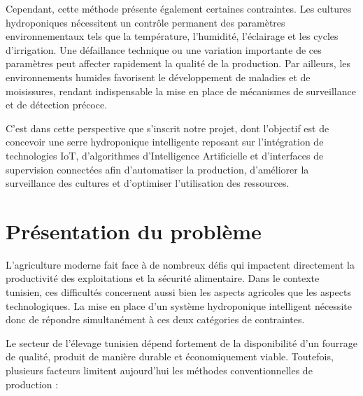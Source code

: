 Cependant, cette méthode présente également certaines contraintes. Les cultures hydroponiques nécessitent un contrôle permanent des paramètres environnementaux tels que la température, l’humidité, l’éclairage et les cycles d’irrigation. Une défaillance technique ou une variation importante de ces paramètres peut affecter rapidement la qualité de la production. Par ailleurs, les environnements humides favorisent le développement de maladies et de moisissures, rendant indispensable la mise en place de mécanismes de surveillance et de détection précoce.

C’est dans cette perspective que s’inscrit notre projet, dont l’objectif est de concevoir une serre hydroponique intelligente reposant sur l’intégration de technologies IoT, d’algorithmes d’Intelligence Artificielle et d’interfaces de supervision connectées afin d’automatiser la production, d’améliorer la surveillance des cultures et d’optimiser l’utilisation des ressources.
\section{Présentation du problème}

L’agriculture moderne fait face à de nombreux défis qui impactent directement la productivité des exploitations et la sécurité alimentaire. Dans le contexte tunisien, ces difficultés concernent aussi bien les aspects agricoles que les aspects technologiques. La mise en place d’un système hydroponique intelligent nécessite donc de répondre simultanément à ces deux catégories de contraintes.


Le secteur de l’élevage tunisien dépend fortement de la disponibilité d’un fourrage de qualité, produit de manière durable et économiquement viable. Toutefois, plusieurs facteurs limitent aujourd’hui les méthodes conventionnelles de production :

